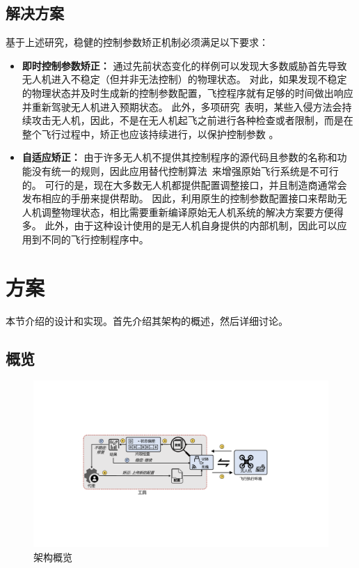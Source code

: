 \subsection{解决方案}
基于上述研究，稳健的控制参数矫正机制必须满足以下要求：

\begin{itemize}
\item \textbf{即时控制参数矫正：}
通过先前状态变化的样例可以发现大多数威胁首先导致无人机进入不稳定（但并非无法控制）的物理状态。
对此，如果发现不稳定的物理状态并及时生成新的控制参数配置，飞控程序就有足够的时间做出响应并重新驾驶无人机进入预期状态。
此外，多项研究~\cite{choi2020cyber,zhou2022doublestar}表明，某些入侵方法会持续攻击无人机，因此，不是在无人机起飞之前进行各种检查或者限制，而是在整个飞行过程中，矫正也应该持续进行，以保护控制参数 。


\item 
\textbf{自适应矫正：}
由于许多无人机不提供其控制程序的源代码且参数的名称和功能没有统一的规则，因此应用替代控制算法~\cite{choi2020software,dash2021pid}来增强原始飞行系统是不可行的。
可行的是，现在大多数无人机都提供配置调整接口，并且制造商通常会发布相应的手册来提供帮助。
因此，利用原生的控制参数配置接口来帮助无人机调整物理状态，相比需要重新编译原始无人机系统的解决方案要方便得多。
此外，由于这种设计使用的是无人机自身提供的内部机制，因此可以应用到不同的飞行控制程序中。

\end{itemize}

\section{方案}
本节介绍\nyctea 的设计和实现。首先介绍其架构的概述，然后详细讨论。

\subsection{概览}

\begin{figure}[htb]
  \centering
    \includegraphics[width=\linewidth]{fig//fix/overview_fix.pdf}
\caption{\nyctea 架构概览}
\label{fig:fix_overview} 
\end{figure}

